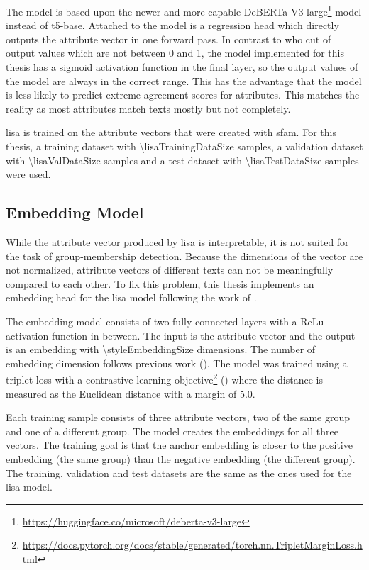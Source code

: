The model is based upon the newer and more capable DeBERTa-V3-large\footnote{\url{https://huggingface.co/microsoft/deberta-v3-large}} model instead of t5-base. Attached to the model is a regression head which directly outputs the attribute vector in one forward pass. In contrast to \citet{patelLearningInterpretableStyle2023} who cut of output values which are not between \num{0} and \num{1}, the model implemented for this thesis has a sigmoid activation function in the final layer, so the output values of the model are always in the correct range. This has the advantage that the model is less likely to predict extreme agreement scores for attributes. This matches the reality as most attributes match texts mostly but not completely.

\ac{lisa} is trained on the attribute vectors that were created with \ac{sfam}. For this thesis, a training dataset with \num{\lisaTrainingDataSize} samples, a validation dataset with \num{\lisaValDataSize} samples and a test dataset with \num{\lisaTestDataSize} samples were used.


\subsection{Embedding Model}
\label{sec:experiments:setup:embedder}
While the attribute vector produced by \ac{lisa} is interpretable, it is not suited for the task of group-membership detection. Because the dimensions of the vector are not normalized, attribute vectors of different texts can not be meaningfully compared to each other. To fix this problem, this thesis implements an embedding head for the \ac{lisa} model following the work of \citet{patelLearningInterpretableStyle2023}.

The embedding model consists of two fully connected layers with a ReLu activation function in between. The input is the attribute vector and the output is an embedding with \num{\styleEmbeddingSize} dimensions. The number of embedding dimension follows previous work (\cite{patelLearningInterpretableStyle2023}). The model was trained using a triplet loss with a contrastive learning objective\footnote{\url{https://docs.pytorch.org/docs/stable/generated/torch.nn.TripletMarginLoss.html}} (\cite{NEURIPS2020_d89a66c7}) where the distance is measured as the Euclidean distance with a margin of \num{5.0}.

Each training sample consists of three attribute vectors, two of the same group and one of a different group. The model creates the embeddings for all three vectors. The training goal is that the anchor embedding is closer to the positive embedding (the same group) than the negative embedding (the different group). The training, validation and test datasets are the same as the ones used for the \ac{lisa} model.


